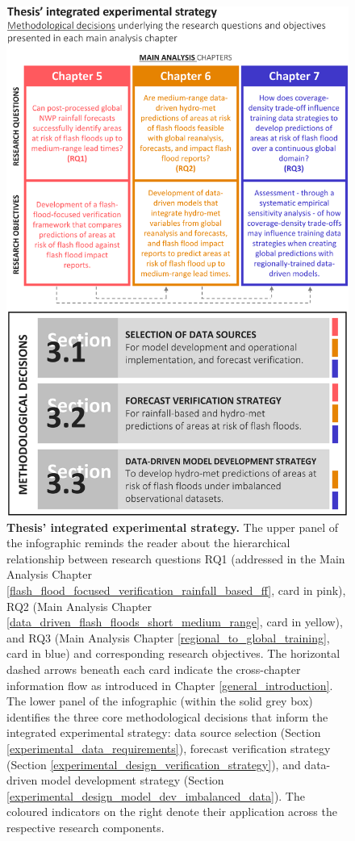 \begin{figure}[htbp]
\centering
\includegraphics[width=\textwidth]{chapter_03/figures/integrated_experimental_strategy.png}
\caption{\textbf{Thesis' integrated experimental strategy.} The upper panel of the infographic reminds the reader about the hierarchical relationship between research questions RQ1 (addressed in the Main Analysis Chapter \ref{flash_flood_focused_verification_rainfall_based_ff}, card in pink), RQ2 (Main Analysis Chapter \ref{data_driven_flash_floods_short_medium_range}, card in yellow), and RQ3 (Main Analysis Chapter \ref{regional_to_global_training}, card in blue) and corresponding research objectives. The horizontal dashed arrows beneath each card indicate the cross-chapter information flow as introduced in Chapter \ref{general_introduction}. The lower panel of the infographic (within the solid grey box) identifies the three core methodological decisions that inform the integrated experimental strategy: data source selection (Section \ref{experimental_data_requirements}), forecast verification strategy (Section \ref{experimental_design_verification_strategy}), and data-driven model development strategy (Section \ref{experimental_design_model_dev_imbalanced_data}). The coloured indicators on the right denote their application across the respective research components.}
\label{fig:integrated_experimental_strategy}
\end{figure}

